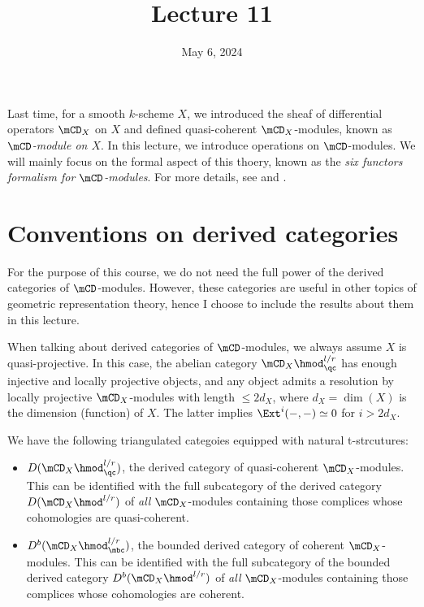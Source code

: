 





\title{Lecture 11}

\date{May 6, 2024}

\maketitle

	Last time, for a smooth $k$-scheme $X$, we introduced the sheaf of differential operators $\mCD_X$ on $X$ and defined quasi-coherent $\mCD_X$-modules, known as \emph{$\mCD$-module on $X$}. In this lecture, we introduce operations on $\mCD$-modules. We will mainly focus on the formal aspect of this thoery, known as the \emph{six functors formalism for $\mCD$-modules}. For more details, see \cite{B} and \cite{HTT}.

\section{Conventions on derived categories}

	For the purpose of this course, we do not need the full power of the derived categories of $\mCD$-modules. However, these categories are useful in other topics of geometric representation theory, hence I choose to include the results about them in this lecture. 

	When talking about derived categories of $\mCD$-modules, we always assume $X$ is quasi-projective. In this case, the abelian category $\mCD_X\hmod_\qc^{l/r}$ has enough injective and locally projective objects, and any object admits a resolution by locally projective $\mCD_X$-modules with length $\le 2d_X$, where $d_X=\dim(X)$ is the dimension (function) of $X$. The latter implies $\Ext^i(-,-)\simeq 0$ for $i>2d_X$.

	We have the following triangulated categoies equipped with natural t-strcutures:
	\begin{itemize}
		\item 
			$D(\mCD_X\hmod_\qc^{l/r})$, the derived category of quasi-coherent $\mCD_X$-modules. This can be identified with the full subcategory of the derived category $D(\mCD_X\hmod^{l/r})$ of \emph{all} $\mCD_X$-modules containing those complices whose cohomologies are quasi-coherent.
		\item
			 $D^b(\mCD_X\hmod_\mbc^{l/r})$, the bounded derived category of coherent $\mCD_X$-modules. This can be identified with the full subcategory of the bounded derived category $D^b(\mCD_X\hmod^{l/r})$ of \emph{all} $\mCD_X$-modules containing those complices whose cohomologies are coherent.
	\end{itemize}

